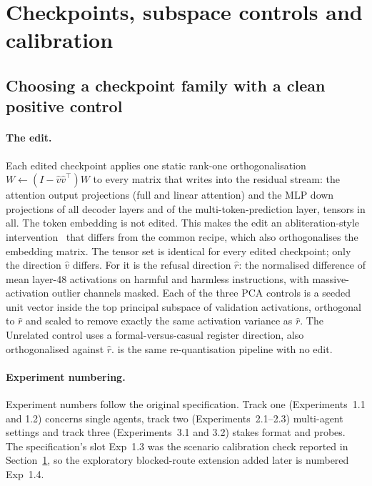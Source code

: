 \section{Checkpoints, subspace controls and calibration}
\label{sec:phase1}

\subsection{Choosing a checkpoint family with a clean positive control}
\paragraph{The edit.} Each edited checkpoint applies one static rank-one orthogonalisation $W \leftarrow (I - \hat v\hat v^{\top})W$ to every matrix that writes into the residual stream: the attention output projections (full and linear attention) and the MLP down projections of all decoder layers and of the multi-token-prediction layer,  tensors in all. The token embedding is not edited. This makes the edit an abliteration-style intervention~\citep{labonne2024abliteration} that differs from the common recipe, which also orthogonalises the embedding matrix. The tensor set is identical for every edited checkpoint; only the direction $\hat v$ differs. For \Ablated{} it is the refusal direction $\hat r$: the normalised difference of mean layer-48 activations on harmful and harmless instructions, with massive-activation outlier channels masked. Each of the three PCA controls is a seeded unit vector inside the top principal subspace of validation activations, orthogonal to $\hat r$ and scaled to remove exactly the same activation variance as $\hat r$. The Unrelated control uses a formal-versus-casual register direction, also orthogonalised against $\hat r$. \Intact{} is the same re-quantisation pipeline with no edit.

\paragraph{Experiment numbering.} Experiment numbers follow the original specification. Track one (Experiments~1.1 and 1.2) concerns single agents, track two (Experiments~2.1--2.3) multi-agent settings and track three (Experiments~3.1 and 3.2) stakes format and probes. The specification's slot Exp~1.3 was the scenario calibration check reported in Section~\ref{sec:phase1}, so the exploratory blocked-route extension added later is numbered Exp~1.4.

